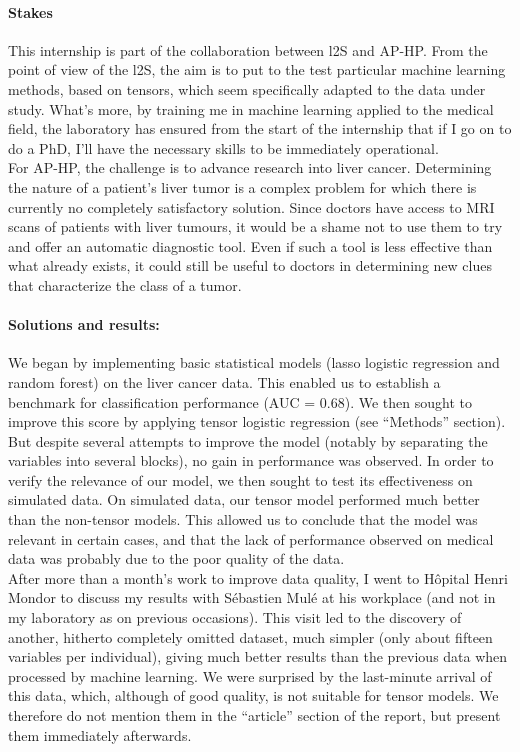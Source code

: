 \documentclass[preprint,12pt]{elsarticle}
\begin{document}
\paragraph*{Stakes} This internship is part of the collaboration between l2S and AP-HP. From the point of view of the l2S, the aim is to put to the test particular machine learning methods, based on tensors, which seem specifically adapted to the data under study. What's more, by training me in machine learning applied to the medical field, the laboratory has ensured from the start of the internship that if I go on to do a PhD, I'll have the necessary skills to be immediately operational.\\
\indent For AP-HP, the challenge is to advance research into liver cancer. Determining the nature of a patient's liver tumor is a complex problem for which there is currently no completely satisfactory solution. Since doctors have access to MRI scans of patients with liver tumours, it would be a shame not to use them to try and offer an automatic diagnostic tool. Even if such a tool is less effective than what already exists, it could still be useful to doctors in determining new clues that characterize the class of a tumor.

\paragraph*{Solutions and results:} We began by implementing basic statistical models (lasso logistic regression and random forest) on the liver cancer data. This enabled us to establish a benchmark for classification performance (AUC = 0.68). We then sought to improve this score by applying tensor logistic regression (see “Methods” section). But despite several attempts to improve the model (notably by separating the variables into several blocks), no gain in performance was observed. In order to verify the relevance of our model, we then sought to test its effectiveness on simulated data. On simulated data, our tensor model performed much better than the non-tensor models. This allowed us to conclude that the model was relevant in certain cases, and that the lack of performance observed on medical data was probably due to the poor quality of the data.\\
\indent After more than a month's work to improve data quality, I went to Hôpital Henri Mondor to discuss my results with Sébastien Mulé at his workplace (and not in my laboratory as on previous occasions). This visit led to the discovery of another, hitherto completely omitted dataset, much simpler (only about fifteen variables per individual), giving much better results than the previous data when processed by machine learning. We were surprised by the last-minute arrival of this data, which, although of good quality, is not suitable for tensor models. We therefore do not mention them in the “article” section of the report, but present them immediately afterwards.
\end{document}
